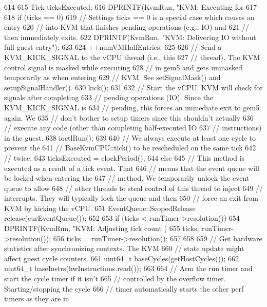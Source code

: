 \begin{DoxyCode}
614 {
615     Tick ticksExecuted;
616     DPRINTF(KvmRun, "KVM: Executing for %
617 
618     if (ticks == 0) {
619         // Settings ticks == 0 is a special case which causes an entry
620         // into KVM that finishes pending operations (e.g., IO) and
621         // then immediately exits.
622         DPRINTF(KvmRun, "KVM: Delivering IO without full guest entry\n");
623 
624         ++numVMHalfEntries;
625 
626         // Send a KVM_KICK_SIGNAL to the vCPU thread (i.e., this
627         // thread). The KVM control signal is masked while executing
628         // in gem5 and gets unmasked temporarily as when entering
629         // KVM. See setSignalMask() and setupSignalHandler().
630         kick();
631 
632         // Start the vCPU. KVM will check for signals after completing
633         // pending operations (IO). Since the KVM_KICK_SIGNAL is
634         // pending, this forces an immediate exit to gem5 again. We
635         // don't bother to setup timers since this shouldn't actually
636         // execute any code (other than completing half-executed IO
637         // instructions) in the guest.
638         ioctlRun();
639 
640         // We always execute at least one cycle to prevent the
641         // BaseKvmCPU::tick() to be rescheduled on the same tick
642         // twice.
643         ticksExecuted = clockPeriod();
644     } else {
645         // This method is executed as a result of a tick event. That
646         // means that the event queue will be locked when entering the
647         // method. We temporarily unlock the event queue to allow
648         // other threads to steal control of this thread to inject
649         // interrupts. They will typically lock the queue and then
650         // force an exit from KVM by kicking the vCPU.
651         EventQueue::ScopedRelease release(curEventQueue());
652 
653         if (ticks < runTimer->resolution()) {
654             DPRINTF(KvmRun, "KVM: Adjusting tick count (%
655                     ticks, runTimer->resolution());
656             ticks = runTimer->resolution();
657         }
658 
659         // Get hardware statistics after synchronizing contexts. The KVM
660         // state update might affect guest cycle counters.
661         uint64_t baseCycles(getHostCycles());
662         uint64_t baseInstrs(hwInstructions.read());
663 
664         // Arm the run timer and start the cycle timer if it isn't
665         // controlled by the overflow timer. Starting/stopping the cycle
666         // timer automatically starts the other perf timers as they are in
}}
\end{DoxyCode}
